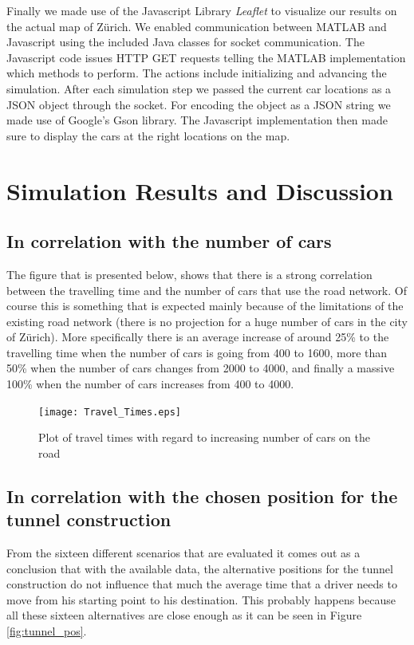 \documentclass[11pt]{article}
\begin{document}
Finally we made use of the Javascript Library \emph{Leaflet}\cite{leaflet} to visualize our results on the actual map of Z\"urich.
We enabled communication between MATLAB and Javascript using the included Java classes for socket communication.
The Javascript code issues HTTP GET requests telling the MATLAB implementation which methods to perform.
The actions include initializing and advancing the simulation.
After each simulation step we passed the current car locations as a JSON object through the socket.
For encoding the object as a JSON string we made use of Google's Gson library\cite{gson}.
The Javascript implementation then made sure to display the cars at the right locations on the map.
\section{Simulation Results and Discussion}
\subsection{In correlation with the number of cars}
The figure that is presented below, shows that there is a strong correlation between the travelling time and the number of cars that use the road network. Of course this is something that is expected mainly because of the limitations of the existing road network (there is no projection for a huge number of cars in the city of Z\"urich). More specifically there is an average increase of around 25\% to the travelling time when the number of cars is going from 400 to 1600, more than 50\% when the number of cars changes from 2000 to 4000, and finally a massive 100\% when the number of cars increases from 400 to 4000.

\begin{figure}[tb]
	\begin{center}
		\texttt{[image: Travel\_Times.eps]}
	\end{center}
	\caption{Plot of travel times with regard to increasing number of cars on the road}
	\label{fig:figure1}
\end{figure}

\subsection{In correlation with the chosen position for the tunnel construction}
From the sixteen different scenarios that are evaluated it comes out as a conclusion that with the available data, the alternative positions for the tunnel construction do not influence that much the average time that a driver needs to move from his starting point to his destination. This probably happens because all these sixteen alternatives are close enough as it can be seen in Figure \ref{fig:tunnel_pos}.
\end{document}
